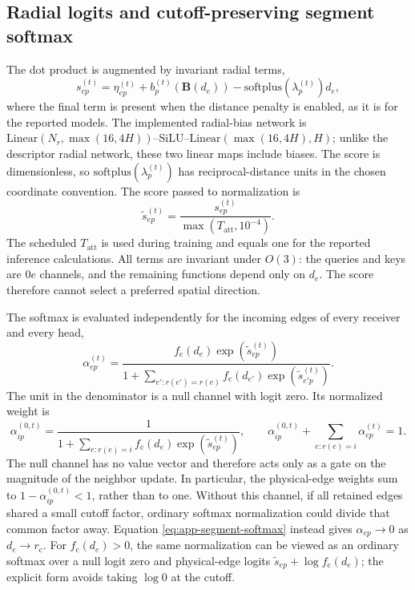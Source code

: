 \documentclass[aps,prx,preprint,notitlepage,superscriptaddress,nofootinbib,floatfix]{revtex4-2}
\newcommand{\vect}[1]{\bm{#1}}
\newif\ifshowrevisions
\newenvironment{draftthirtyoneblock}
  {\ifshowrevisions\color{draftthirtyonecolor}\fi}
  {}
\newcommand{\draftthirtytwo}[1]{%
  \ifshowrevisions\textcolor{draftthirtytwocolor}{#1}\else#1\fi}
\begin{document}
\begin{draftthirtyoneblock}
\subsection{Radial logits and cutoff-preserving segment softmax}

The dot product is augmented by invariant radial terms,
\begin{equation}
 s_{ep}^{(t)}
 =
 \eta_{ep}^{(t)}
 +b_p^{(t)}(\vect B(d_e))
 -\mathrm{softplus}(\lambda_p^{(t)})d_e ,
 \label{eq:app-full-logit}
\end{equation}
where the final term is present when the distance penalty is enabled, as it is
for the reported models.
\draftthirtytwo{The implemented radial-bias network is
\(\mathrm{Linear}(N_r,\max(16,4H))\)--SiLU--\(\mathrm{Linear}(\max(16,4H),H)\);
unlike the descriptor radial network, these two linear maps include biases.
The score is dimensionless, so
\(\mathrm{softplus}(\lambda_p^{(t)})\) has reciprocal-distance units in the
chosen coordinate convention.}
The score passed to normalization is
\begin{equation}
 \widetilde s_{ep}^{(t)}
 =\frac{s_{ep}^{(t)}}{\max(T_{\mathrm{att}},10^{-4})}.
 \label{eq:app-temperature}
\end{equation}
The scheduled \(T_{\mathrm{att}}\) is used during training and equals one for
the reported inference calculations. All terms are invariant under \(O(3)\):
the queries and keys are \(0e\) channels, and the remaining functions depend
only on \(d_e\). The score therefore cannot select a preferred spatial
direction.

The softmax is evaluated independently for the incoming edges of every
receiver and every head,
\begin{equation}
 \alpha_{ep}^{(t)}
 =
 \frac{
 f_{\mathrm c}(d_e)\exp(\widetilde s_{ep}^{(t)})
 }{
 1+\displaystyle\sum_{e':r(e')=r(e)}
 f_{\mathrm c}(d_{e'})\exp(\widetilde s_{e'p}^{(t)})
 }.
 \label{eq:app-segment-softmax}
\end{equation}
The unit in the denominator is a null channel with logit zero. Its normalized
weight is
\begin{equation}
 \alpha^{(0,t)}_{ip}
 =
 \frac{1}{
 1+\displaystyle\sum_{e:r(e)=i}
 f_{\mathrm c}(d_e)\exp(\widetilde s^{(t)}_{ep})},
 \qquad
 \alpha^{(0,t)}_{ip}+\sum_{e:r(e)=i}\alpha^{(t)}_{ep}=1 .
 \label{eq:app-null-weight}
\end{equation}
The null channel has no value vector and therefore acts only as a gate on the
magnitude of the neighbor update. In particular, the physical-edge weights
sum to \(1-\alpha^{(0,t)}_{ip}<1\), rather than to one. Without this channel,
if all retained edges shared a small cutoff factor, ordinary softmax
normalization could divide that common factor away. Equation
\eqref{eq:app-segment-softmax} instead gives
\(\alpha_{ep}\rightarrow0\) as \(d_e\rightarrow r_{\mathrm c}\).
For \(f_{\mathrm c}(d_e)>0\), the same normalization can be viewed as an
ordinary softmax over a null logit zero and physical-edge logits
\(\widetilde s_{ep}+\log f_{\mathrm c}(d_e)\); the explicit form avoids taking
\(\log 0\) at the cutoff.


\end{draftthirtyoneblock}
\end{document}

